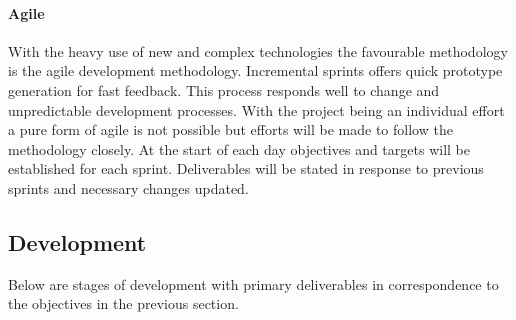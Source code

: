 \documentclass[a4paper, 11pt]{article}
\begin{document}
  \vspace{\baselineskip}

\paragraph{Agile}With the heavy use of new and complex technologies the favourable methodology is the agile development methodology. Incremental sprints offers quick prototype generation for fast feedback. This process responds well to change and unpredictable development processes. With the project being an individual effort a pure form of agile is not possible but efforts will be made to follow the methodology closely. At the start of each day objectives and targets will be established for each sprint. Deliverables will be stated in response to previous sprints and necessary changes updated.

\subsection{Development}
Below are stages of development with primary deliverables in correspondence to the objectives in the previous section.
\end{document}
